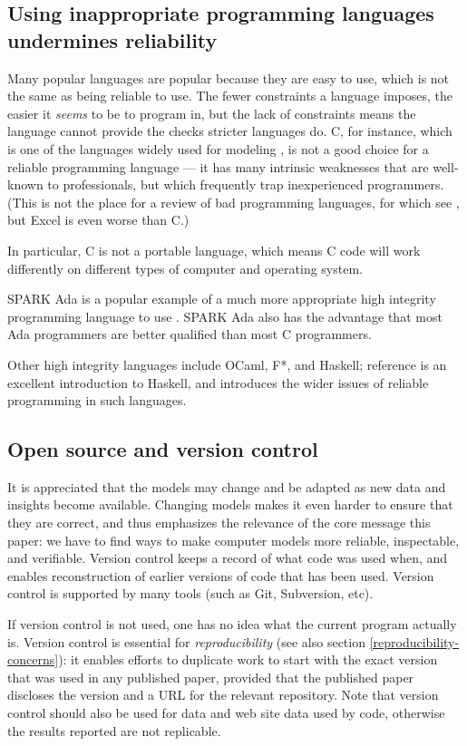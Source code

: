 \documentclass[10pt,a4paper]{article}
\begin{document}
\subsection{Using inappropriate programming languages undermines reliability}
Many popular languages are popular because they are easy to use, which is not the same as being reliable to use. The fewer constraints a language imposes, the easier it \emph{seems\/} to be to program in, but the lack of constraints means the language cannot provide the checks stricter languages do. C, for instance, which is one of the languages widely used for modeling \cite{tweet,plos}, is not a good choice for a reliable programming language --- it has many intrinsic weaknesses that are well-known to professionals, but which frequently trap inexperienced programmers. (This is not the place for a review of bad programming languages, for which see \cite{heedless}, but Excel is even worse than C\@.) 

In particular, C is not a portable language, which means C code will work differently on different types of computer and operating system. 

SPARK Ada is a popular example of a much more appropriate high integrity programming language to use \cite{spark}. SPARK Ada also has the advantage that most Ada programmers are better qualified than most C programmers. 

Other high integrity languages include  OCaml, F*, and Haskell; reference \cite{haskell} is an excellent introduction to Haskell, and introduces the wider issues of reliable programming in such languages.

\subsection{Open source and version control}
It is appreciated that the models may change and be adapted as new data and insights become available. Changing models makes it even harder to ensure that they are correct, and thus emphasizes the relevance of the core message this paper: we have to find ways to make computer models more reliable, inspectable, and verifiable. Version control keeps a record of what code was used when, and enables reconstruction of earlier versions of code that has been used. Version control is supported by many tools (such as Git, Subversion, etc). 

If version control is not used, one has no idea what the current program actually is. {Version control is essential for \emph{reproducibility\/} \cite{basic-reproducibilty,reproducibility} (see also section \ref{reproducibility-concerns}): it enables efforts to duplicate work to start with the exact version that was used in any published paper, provided that the published paper discloses the version and a URL for the relevant repository. Note that version control should also be used for data and web site data used by code, otherwise the results reported are not replicable.}
\end{document}
